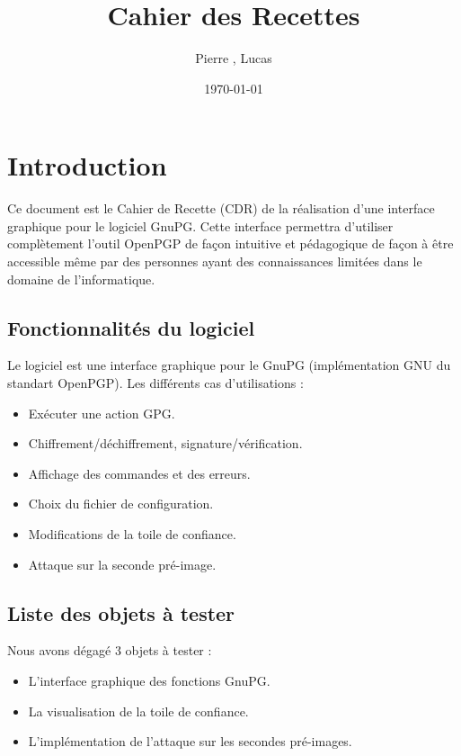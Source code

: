 \documentclass{../res/univ-projet}
\title{Cahier des Recettes}
\author{Pierre \bsc{Balmelle}, Lucas \bsc{Barbay}}
\date{\today}
\begin{document}
\maketitle
\newpage
\tableofcontents
\newpage

\section{Introduction}

Ce document est le Cahier de Recette (CDR) de la réalisation d'une interface graphique pour le logiciel GnuPG.
Cette interface permettra d'utiliser complètement l'outil OpenPGP de façon intuitive et pédagogique de façon 
à être accessible même par des personnes ayant des connaissances limitées dans le domaine de l'informatique. 

\subsection{Fonctionnalités du logiciel}
Le logiciel est une interface graphique pour le GnuPG (implémentation GNU du standart OpenPGP).
Les différents cas d'utilisations :
\begin{itemize}
 \item Exécuter une action GPG.
 \item Chiffrement/déchiffrement, signature/vérification.
 \item Affichage des commandes et des erreurs.
 \item Choix du fichier de configuration.
 \item Modifications de la toile de confiance.
 \item Attaque sur la seconde pré-image.
\end{itemize}

\subsection{Liste des objets à tester}
Nous avons dégagé 3 objets à tester : 
\begin{itemize}
 \item L'interface graphique des fonctions GnuPG.
 \item La visualisation de la toile de confiance.
 \item L'implémentation de l'attaque sur les secondes pré-images. 
\end{itemize}
\end{document}
